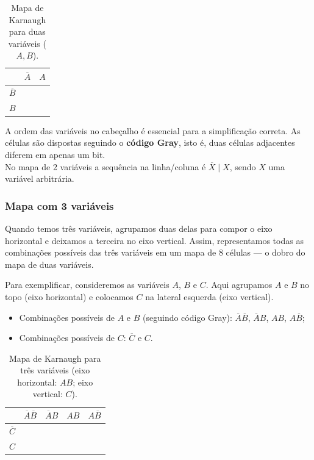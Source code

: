 \documentclass[12pt]{article}
\begin{document}
\begin{table}[htb]
\centering
\renewcommand{\arraystretch}{1.3} %
\begin{tabular}{|c|c|c|}
\hline
 & $\overline{A}$ & $A$ \\
\hline
$\overline{B}$ &  &  \\
\hline
$B$ &  &  \\
\hline
\end{tabular}
\caption{Mapa de Karnaugh para duas variáveis (\(A,B\)).}
\label{tab:karnaugh-2var}
\end{table}

\begin{tcolorbox}[mynote, title=\textbf{Ordem e Disposição das Variáveis}]
A ordem das variáveis no cabeçalho é essencial para a simplificação correta.  
As células são dispostas seguindo o \textbf{código Gray}, isto é, duas células adjacentes diferem em apenas um bit. \\
No mapa de 2 variáveis a sequência na linha/coluna é $\overline{X} \mid X$, sendo \(X\) uma variável arbitrária.  
\end{tcolorbox}

\subsubsection{Mapa com 3 variáveis}
\label{subsec:3variaveis}

Quando temos três variáveis, agrupamos duas delas para compor o eixo horizontal e deixamos a terceira no eixo vertical. Assim, representamos todas as combinações possíveis das três variáveis em um mapa de 8 células — o dobro do mapa de duas variáveis.

\vspace{0.5cm}

Para exemplificar, consideremos as variáveis \(A\), \(B\) e \(C\).  
Aqui agrupamos \(A\) e \(B\) no topo (eixo horizontal) e colocamos \(C\) na lateral esquerda (eixo vertical).

\begin{itemize}
    \item Combinações possíveis de \(A\) e \(B\) (seguindo código Gray): $\overline{A}\overline{B}$, $\overline{A}B$, $AB$, $A\overline{B}$;
    \item Combinações possíveis de \(C\): $\overline{C}$ e $C$.
\end{itemize}

\begin{table}[htb]
\centering
\renewcommand{\arraystretch}{1.3}
\begin{tabular}{|c|c|c|c|c|}
\hline
 & $\overline{A}\overline{B}$ & $\overline{A}B$ & $AB$ & $A\overline{B}$ \\
\hline
$\overline{C}$ &  &  &  &  \\
\hline
$C$ &  &  &  &  \\
\hline
\end{tabular}
\caption{Mapa de Karnaugh para três variáveis (eixo horizontal: \(AB\); eixo vertical: \(C\)).}
\label{tab:karnaugh-3var}
\end{table}
\end{document}

